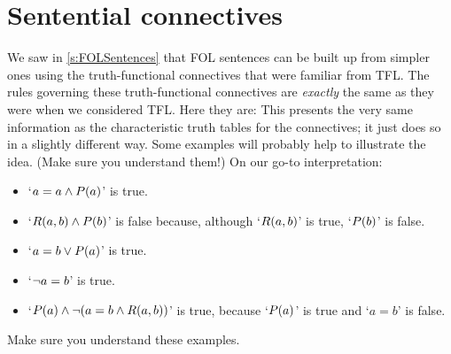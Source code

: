 \section{Sentential connectives}
We saw in \cref{s:FOLSentences} that FOL sentences can be built up from simpler ones using the truth-functional connectives that were familiar from TFL. The rules governing these truth-functional connectives are \emph{exactly} the same as they were when we considered TFL. Here they are:
This presents the very same information as the characteristic truth tables for the connectives; it just does so in a slightly different way. Some examples will probably help to illustrate the idea. (Make sure you understand them!) On our go-to interpretation:
	\begin{itemize}
		\item `$a = a \wedge \mathord{P}(a)$' is true.
		\item `$\mathord{R}(a,b) \wedge \mathord{P}(b)$' is false because, although `$\mathord{R}(a,b)$' is true, `$\mathord{P}(b)$' is false.
		\item `$a = b \vee \mathord{P}(a)$' is true.
		\item `$\neg a = b$' is true.
		\item `$\mathord{P}(a) \wedge \neg( a= b \wedge \mathord{R}(a,b))$' is true, because `$\mathord{P}(a)$' is true and `$a = b$' is false.
	\end{itemize}
Make sure you understand these examples.

